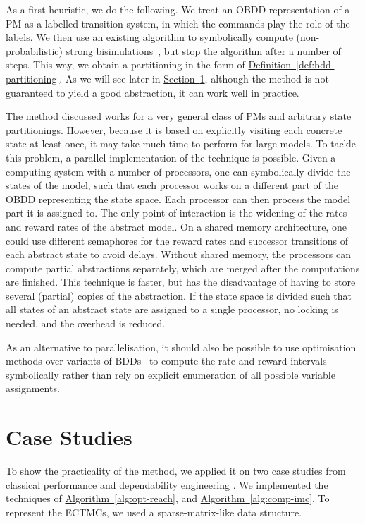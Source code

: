 \documentclass[10pt,twocolumn]{article}
\newcommand{\refsec}[1]{\texorpdfstring{\hyperref[sec:#1]{Section~\ref*{sec:#1}}}{Section~\ref*{sec:#1}}}
\newcommand{\refdef}[1]{\texorpdfstring{\hyperref[def:#1]{Definition~\ref*{def:#1}}}{Definition \ref*{def:#1}}}
\newcommand{\refalg}[1]{\texorpdfstring{\hyperref[alg:#1]{Algorithm~\ref*{alg:#1}}}{Algorithm~\ref*{alg:#1}}}
\begin{document}
As a first heuristic, we do the following. We treat an OBDD
representation of a PM as a labelled transition system, in which the
commands play the role of the labels. We then use an existing
algorithm to symbolically compute (non-probabilistic) strong
bisimulations~\cite{wimmer-et-al-atva-2006}, but stop the algorithm
after a number of steps. This way, we obtain a partitioning in the
form of \refdef{bdd-partitioning}. As we will see later in
\refsec{case-studies}, although the method is not guaranteed to yield
a good abstraction, it can work well in practice.

The method discussed works for a very general class of PMs and
arbitrary state partitionings. However, because it is based on
explicitly visiting each concrete state at least once, it may take
much time to perform for large models.  To tackle this problem, a
parallel implementation of the technique is possible.  Given a
computing system with a number of processors, one can symbolically
divide the states of the model, such that each processor works on a
different part of the OBDD representing the state space.  Each
processor can then process the model part it is assigned to.  The only
point of interaction is the widening of the rates and reward rates of
the abstract model.  On a shared memory architecture, one could use
different semaphores for the reward rates and successor transitions of
each abstract state to avoid delays.  Without shared memory, the
processors can compute partial abstractions separately, which are
merged after the computations are finished.  This technique is faster,
but has the disadvantage of having to store several (partial) copies
of the abstraction.  If the state space is divided such that all
states of an abstract state are assigned to a single processor, no
locking is needed, and the overhead is reduced.

As an alternative to parallelisation, it should also be possible to
use optimisation methods over variants of
BDDs~\cite{LaiPV94,Knuth09,OssowskiB06,WanCM11} to compute the rate
and reward intervals symbolically rather than rely on explicit
enumeration of all possible variable assignments.

\section{Case Studies}
\label{sec:case-studies}
\noindent To show the practicality of the method, we applied it on two case
studies from classical performance and
dependability engineering \cite{HaverkortHK00,ClothH05}.
We implemented the techniques of \refalg{opt-reach}, and \refalg{comp-imc}.
To represent the ECTMCs, we used a sparse-matrix-like data structure.
\end{document}
